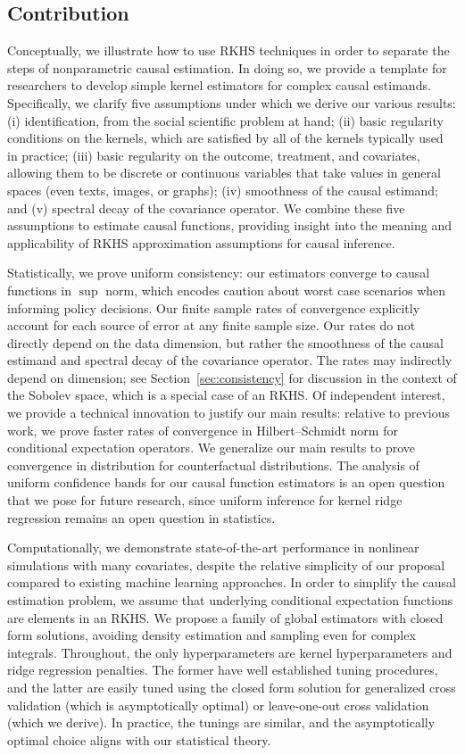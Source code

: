 \subsection{Contribution}

Conceptually, we illustrate how to use RKHS techniques in order to separate the steps of nonparametric causal estimation. In doing so, we provide a template for researchers to develop simple kernel estimators for complex causal estimands. Specifically, we clarify five assumptions under which we derive our various results: (i) identification, from the social scientific problem at hand; (ii) basic regularity conditions on the kernels, which are satisfied by all of the kernels typically used in practice; (iii) basic regularity on the  outcome, treatment, and covariates, allowing them to be discrete or continuous variables that take values in general spaces (even texts, images, or graphs); (iv) smoothness of the causal estimand; and (v) spectral decay of the covariance operator. We combine these five assumptions to estimate causal functions, providing insight into the meaning and applicability of RKHS approximation assumptions for causal inference.

Statistically, we prove uniform consistency: our estimators converge to causal functions in $\sup$ norm, which encodes caution about worst case scenarios when informing policy decisions. Our finite sample rates of convergence explicitly account for each source of error at any finite sample size. Our rates do not directly depend on the data dimension, but rather the smoothness of the causal estimand and spectral decay of the covariance operator. The rates may indirectly depend on dimension; see Section~\ref{sec:consistency} for discussion in the context of the Sobolev space, which is a special case of an RKHS. Of independent interest, we provide a technical innovation to justify our main results: relative to previous work, we prove faster rates of convergence in Hilbert--Schmidt norm for conditional expectation operators. We generalize our main results to prove convergence in distribution for counterfactual distributions. The analysis of uniform confidence bands for our causal function estimators is an open question that we pose for future research, since uniform inference for kernel ridge regression remains an open question in statistics.

Computationally, we demonstrate state-of-the-art performance in nonlinear simulations with many covariates, despite the relative simplicity of our proposal compared to existing machine learning approaches. In order to simplify the causal estimation problem, we assume that underlying conditional expectation functions are elements in an RKHS. We propose a family of global estimators with closed form solutions, avoiding density estimation and sampling even for complex integrals. Throughout, the only hyperparameters are kernel hyperparameters and ridge regression penalties. The former have well established tuning procedures, and the latter are easily tuned using the closed form solution for generalized cross validation (which is asymptotically optimal) or leave-one-out cross validation (which we derive). In practice, the tunings are similar, and the asymptotically optimal choice aligns with our statistical theory.

